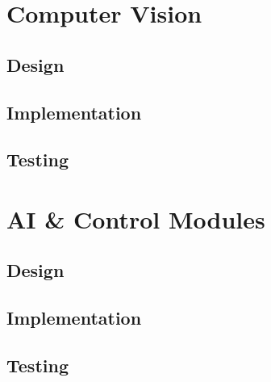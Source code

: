 \section{Computer Vision}\label{soft/cv}

\subsection{Design}\label{soft/cv/design}

\subsection{Implementation}\label{soft/cv/impl}

\subsection{Testing}\label{soft/cv/test}



\section{AI \& Control Modules}\label{soft/ai}

\subsection{Design}\label{soft/ai/design}

\subsection{Implementation}\label{soft/ai/impl}

\subsection{Testing}\label{soft/ai/test}